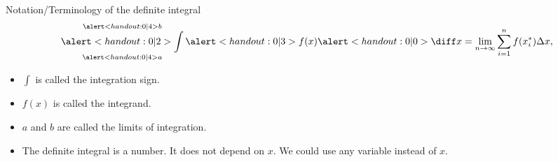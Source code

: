 \begin{frame}{Notation/Terminology of the definite integral}
\[
\mathop{\alert<handout:0| 2>{\int}}_{\alert<handout:0| 4>{a}}^{\alert<handout:0| 4>{b}} \alert<handout:0| 3>{f(x)} \alert<handout:0| 0>{\diff x} = \lim_{n\to \infty} \sum_{i=1}^n f(x_i^*)\Delta x,
\]
\begin{itemize}
\item<1-| alert@2>  $\int$ is called the integration sign.
\item<1-| alert@3>  $f(x)$ is called the integrand.
\item<1-| alert@4>  $a$ and $b$ are called the limits of integration.
\item<5->  The definite integral is a number.  It does not depend on $x$.  We could use any variable instead of $x$.
\end{itemize}
%

\end{frame}
